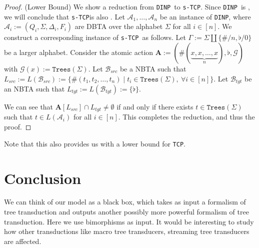 \documentclass[12pt, a4paper]{article}
\newcommand{\typecheckingProblem}{\texttt{s-TCP}}
\newcommand{\metaTypecheckingProblem}{\texttt{TCP}}
\newcommand{\intersectionNonemptiness}{\texttt{DINP}}
\newcommand{\Alphabet}{\ensuremath{\Sigma}}
\newcommand{\Trees}[1]{\ensuremath{\texttt{Trees}\left(#1\right)}}
\newcommand{\Transitions}{\ensuremath{\Delta}}
\newcommand{\action}{\ensuremath{\mathbf{A}}}
\newcommand{\automaton}{\ensuremath{\mathcal{A}}}
\newcommand{\automatonB}{\ensuremath{\mathcal{B}}}
\newcommand{\guardFunction}{\ensuremath{\mathcal{G}}}
\newcommand{\guard}[1]{\ensuremath{\guardFunction(#1)}}
\begin{document}
\begin{proof}
    (Lower Bound) We show a reduction from \intersectionNonemptiness\ to \typecheckingProblem. Since \intersectionNonemptiness\ is \expth, we will conclude that \typecheckingProblem is also \expth. Let $\automaton_1, \dots, \automaton_n$ be an instance of \intersectionNonemptiness, where $\automaton_i := (Q_i, \Alphabet, \Transitions_i, F_i)$ are DBTA over the alphabet $\Alphabet$ for all $i \in [n]$. We construct a corresponding instance of \typecheckingProblem\ as follows. Let $\Gamma := \Alphabet \coprod \{\#/n, \flat/0\}$ be a larger alphabet. Consider the atomic action $\action := (\#(\underbrace{x, x, \dots, x}_{n}), \flat, \guardFunction)$ with $\guard{x} := \Trees{\Alphabet}$. Let $\automatonB_{src}$ be a NBTA such that $L_{src} := L(\automatonB_{src}) := \{\#(t_1, t_2, \dots, t_n) \mid t_i \in \Trees{\Alphabet},~\forall i \in [n]\}$. Let $\automatonB_{tgt}$ be an NBTA such that $L_{tgt} := L(\automatonB_{tgt}) := \{\flat\}$.

    We can see that $\action[L_{src}] \cap L_{tgt} \neq \emptyset$ if and only if there exists $t \in \Trees{\Alphabet}$ such that $t \in L(\automaton_i)$ for all $i \in [n]$. This completes the reduction, and thus the proof.
\end{proof}

Note that this also provides us with a lower bound for \metaTypecheckingProblem.



\section{Conclusion}\label{sec:Conclusion}

We can think of our model as a black box, which takes as input a formalism of tree transduction and outputs another possibly more powerful formalism of tree transduction. Here we use bimorphisms as input. It would be interesting to study how other transductions like macro tree transducers, streaming tree transducers are affected.


\end{document}
